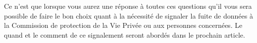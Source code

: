 Ce n’est que lorsque vous aurez une réponse à toutes ces questions qu’il vous sera possible de faire le bon choix quant à la nécessité de signaler la fuite de données à la Commission de protection de la Vie Privée ou aux personnes concernées. Le quand et le comment de ce signalement seront abordés dans le prochain article.








